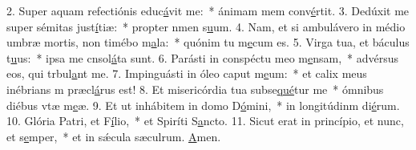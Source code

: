 2. Super aquam refectiónis educ\uline{á}vit me:~* ánimam mem conv\uline{é}rtit.
3. Dedúxit me super sémitas just\uline{í}tiæ:~* propter nmen s\uline{u}um.
4. Nam, et si ambulávero in médio umbræ mortis, non timébo m\uline{a}la:~* quónim tu m\uline{e}cum es.
5. Virga tua, et báculus t\uline{u}us:~* ipsa me cnsol\uline{á}ta sunt.
6. Parásti in conspéctu meo m\uline{e}nsam,~* advérsus eos, qui trbul\uline{a}nt me.
7. Impinguásti in óleo caput m\uline{e}um:~* et calix meus inébrians m præcl\uline{á}rus est!
8. Et misericórdia tua subse\uline{qué}tur me~* ómnibus diébus vtæ m\uline{e}æ.
9. Et ut inhábitem in domo D\uline{ó}mini,~* in longitúdinm di\uline{é}rum.
10. Glória Patri, et F\uline{í}lio,~* et Spiríti S\uline{a}ncto.
11. Sicut erat in princípio, et nunc, et s\uline{e}mper,~* et in sǽcula sæculrum. \uline{A}men.
